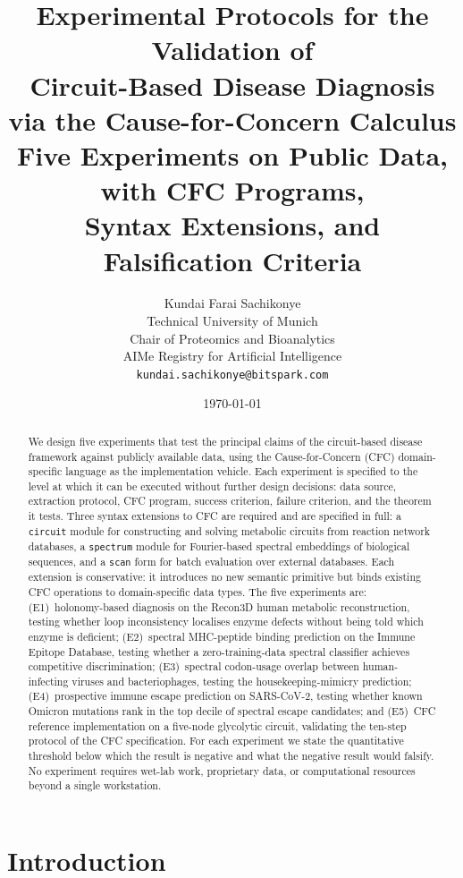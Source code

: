 \documentclass[11pt,a4paper]{article}
\title{\textbf{Experimental Protocols for the Validation of\\
Circuit-Based Disease Diagnosis\\
via the Cause-for-Concern Calculus}\\[6pt]
\large Five Experiments on Public Data, with CFC Programs,\\
Syntax Extensions, and Falsification Criteria}
\author{%
Kundai Farai Sachikonye\\
\small Technical University of Munich\\
\small Chair of Proteomics and Bioanalytics\\
\small AIMe Registry for Artificial Intelligence\\
\small \texttt{kundai.sachikonye@bitspark.com}}
\date{\today}
\theoremstyle{expthm}
\theoremstyle{definition}
\theoremstyle{remark}
\newcommand{\cf}[1]{\texttt{#1}}
\begin{document}
\maketitle

\begin{abstract}
\noindent
We design five experiments that test the principal claims of the
circuit-based disease framework against publicly available data, using the
Cause-for-Concern (CFC) domain-specific language as the implementation
vehicle. Each experiment is specified to the level at which it can be
executed without further design decisions: data source, extraction
protocol, CFC program, success criterion, failure criterion, and the
theorem it tests. Three syntax extensions to CFC are required and are
specified in full: a \cf{circuit} module for constructing and solving
metabolic circuits from reaction network databases, a \cf{spectrum}
module for Fourier-based spectral embeddings of biological sequences, and
a \cf{scan} form for batch evaluation over external databases. Each
extension is conservative: it introduces no new semantic primitive but
binds existing CFC operations to domain-specific data types. The five
experiments are: (E1)~holonomy-based diagnosis on the Recon3D human
metabolic reconstruction, testing whether loop inconsistency localises
enzyme defects without being told which enzyme is deficient;
(E2)~spectral MHC-peptide binding prediction on the Immune Epitope
Database, testing whether a zero-training-data spectral classifier
achieves competitive discrimination; (E3)~spectral codon-usage overlap
between human-infecting viruses and bacteriophages, testing the
housekeeping-mimicry prediction; (E4)~prospective immune escape
prediction on SARS-CoV-2, testing whether known Omicron mutations rank
in the top decile of spectral escape candidates; and (E5)~CFC reference
implementation on a five-node glycolytic circuit, validating the
ten-step protocol of the CFC specification. For each experiment we state
the quantitative threshold below which the result is negative and what
the negative result would falsify. No experiment requires wet-lab work,
proprietary data, or computational resources beyond a single workstation.
\end{abstract}

\tableofcontents

\section{Introduction}
\label{sec:intro}
\end{document}
